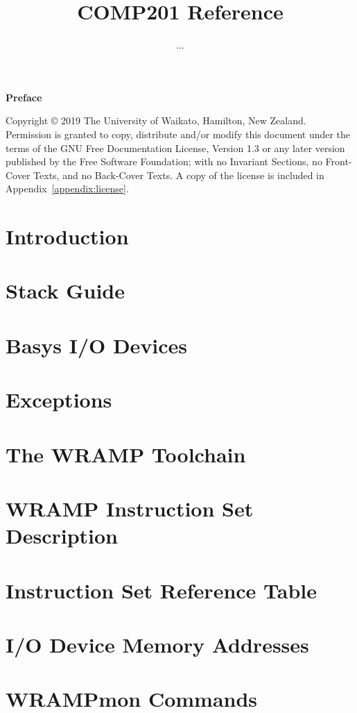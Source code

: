 \documentclass[a4paper]{book}
\title{COMP201 Reference}
\author{...}
\begin{document}

\begin{Huge}
\vspace{2cm}
\textbf{Preface}\\
\vspace{1.5cm}
\end{Huge}




Copyright \copyright{} 2019 The University of Waikato, Hamilton, New Zealand.
Permission is granted to copy, distribute and/or modify this document
under the terms of the GNU Free Documentation License, Version 1.3
or any later version published by the Free Software Foundation;
with no Invariant Sections, no Front-Cover Texts, and no Back-Cover Texts.
A copy of the license is included in Appendix~\ref{appendix:license}.

\tableofcontents

\chapter{Introduction}
\label{chapter:intro}

\chapter{Stack Guide}
\label{chapter:stack}

\chapter{Basys I/O Devices}
\label{chapter:io}

\chapter{Exceptions}
\label{chapter:exceptions}

\appendix
\chapter{The WRAMP Toolchain}
\label{appendix:toolchain}

\chapter{WRAMP Instruction Set Description}
\label{appendix:instr}

\chapter{Instruction Set Reference Table}
\label{appendix:instrsm}
\addtolength{\hoffset}{-1cm}
\addtolength{\textwidth}{1cm}

\chapter{I/O Device Memory Addresses}
\addtolength{\hoffset}{1cm}
\addtolength{\textwidth}{-1cm}
\label{appendix:memory-map}

\chapter{WRAMPmon Commands}
\label{appendix:wrampmon}



\end{document}
